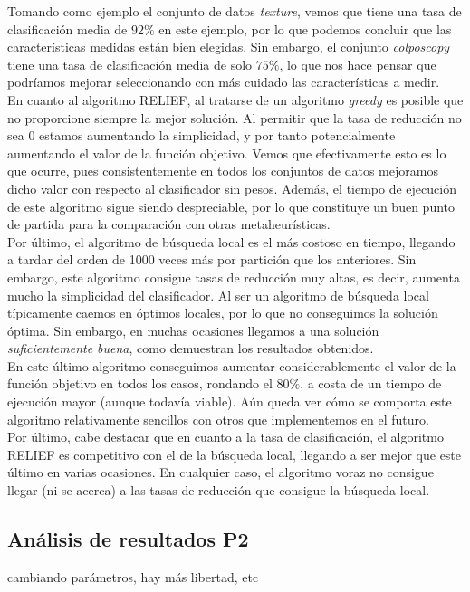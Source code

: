 \documentclass[12pt]{article}
\begin{document}
Tomando como ejemplo el conjunto de datos \textit{texture}, vemos que tiene una tasa de clasificación media de $92\%$ en este ejemplo, por lo que podemos concluir que las características medidas están bien elegidas. Sin embargo, el conjunto \textit{colposcopy} tiene una tasa de clasificación media de solo $75\%$, lo que nos hace pensar que podríamos mejorar seleccionando con más cuidado las características a medir.\\

En cuanto al algoritmo RELIEF, al tratarse de un algoritmo \textit{greedy} es posible que no proporcione siempre la mejor solución. Al permitir que la tasa de reducción no sea $0$ estamos aumentando la simplicidad, y por tanto potencialmente aumentando el valor de la función objetivo. Vemos que efectivamente esto es lo que ocurre, pues consistentemente en todos los conjuntos de datos mejoramos dicho valor con respecto al clasificador sin pesos. Además, el tiempo de ejecución de este algoritmo sigue siendo despreciable, por lo que constituye un buen punto de partida para la comparación con otras metaheurísticas.\\

Por último, el algoritmo de búsqueda local es el más costoso en tiempo, llegando a tardar del orden de 1000 veces más por partición que los anteriores. Sin embargo, este algoritmo consigue tasas de reducción muy altas, es decir, aumenta mucho la simplicidad del clasificador. Al ser un algoritmo de búsqueda local típicamente caemos en óptimos locales, por lo que no conseguimos la solución óptima. Sin embargo, en muchas ocasiones llegamos a una solución \textit{suficientemente buena}, como demuestran los resultados obtenidos.\\

En este último algoritmo conseguimos aumentar considerablemente el valor de la función objetivo en todos los casos, rondando el 80$\%$, a costa de un tiempo de ejecución mayor (aunque todavía viable). Aún queda ver cómo se comporta este algoritmo relativamente sencillos con otros que implementemos en el futuro.\\

Por último, cabe destacar que en cuanto a la tasa de clasificación, el algoritmo RELIEF es competitivo con el de la búsqueda local, llegando a ser mejor que este último en varias ocasiones. En cualquier caso, el algoritmo voraz no consigue llegar (ni se acerca) a las tasas de reducción que consigue la búsqueda local.

\subsection*{Análisis de resultados P2}
\label{analisis}

cambiando parámetros, hay más libertad, etc
\end{document}
